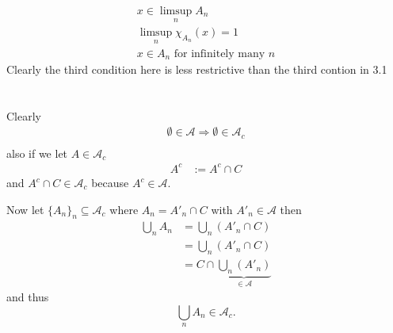 \documentclass{unswmaths}
\begin{document}
\begin{align*}
    x \in \limsup_{n} A_n \\
    \limsup_{n} \chi_{A_n}(x) = 1\\
    x \in A_n \text{ for infinitely many } n 
\end{align*}
Clearly the third condition here is less restrictive than the third contion in 3.1

\section{}
\subsection{}
Clearly
\begin{align*}
    \emptyset \in \mathcal{A} \Longrightarrow \emptyset \in \mathcal{A}_{c} \\
\end{align*}
also if we let $ A \in \mathcal{A}_{c} $
\begin{align*}
    A^{c} &:= A^{c} \cap C
\end{align*}
and $ A^{c} \cap C \in \mathcal{A}_{c} $ because $ A^{c} \in \mathcal{A} $.

Now let $ \{ A_n \}_n \subseteq \mathcal{A}_{c} $ where $ A_n = A'_n \cap C $ with $ A'_n \in \mathcal{A} $ then 
\begin{align*}
    \bigcup_{n} A_n &= \bigcup_{n} (A'_n \cap C) \\
        &= \bigcup_{n} (A'_n \cap C) \\
        &= C \cap \underbrace{\bigcup_{n} (A'_n)}_{\in \mathcal{A}}
\end{align*}
and thus 
$$
    \bigcup_{n} A_n \in \mathcal{A}_{c}.
$$
\end{document}
